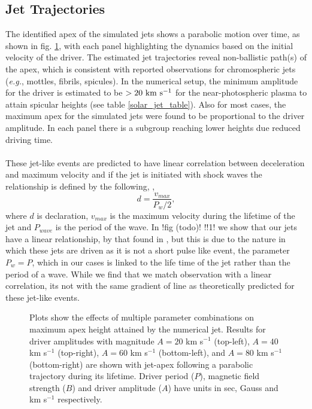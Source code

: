 \documentclass[12pt]{ociamthesis}
\newcommand{\np}{\\ \\}
\begin{document}
\subsection{Jet Trajectories}
\label{subsec:jet_traj}
The identified apex of the simulated jets shows a parabolic motion over time, as shown in fig. \ref{jet_traj}, with each panel highlighting the dynamics based on the initial velocity of the driver. The estimated jet trajectories reveal non-ballistic path(s) of the apex, which is consistent with reported observations \citep{Hansteen2006ApJ, Rouppe2007ApJ660L169R, Pontieu2007PASJ} for chromospheric jets (\textit{e.g.}, mottles, fibrils, spicules). In the numerical setup, the minimum amplitude for the driver is estimated to be $>20 ~\rm{km ~s^{-1}}$ for the near-photospheric plasma to attain spicular heights (see table \ref{solar_jet_table}). Also for most cases, the maximum apex for the simulated jets were found to be proportional to the driver amplitude. In each panel there is a subgroup reaching lower heights due reduced driving time. \np  
%
These jet-like events are predicted to have linear correlation between deceleration and maximum velocity and if the jet is initiated with shock waves the relationship is defined by the following, \citep{Heggland2007ApJ6661277H},
\begin{equation}
d = \frac{v_{max}}{P_{w}/2},
\end{equation}
where $d$ is declaration, $v_{max}$ is the maximum velocity during the lifetime of the jet and $P_{wave}$ is the period of the wave. In !fig (todo)! !!1! we show that our jets have a linear relationship, by that found in \citep{Heggland2007ApJ6661277H}, but this is due to the nature in which these jets are driven as it is not a short pulse like event, the parameter $P_{w}=P$, which in our cases is linked to the life time of the jet rather than the period of a wave. While we find that we match observation with a linear correlation, its not with the same gradient of line as theoretically predicted for these jet-like events.
\begin{figure}
\captionsetup[subfigure]{labelformat=empty}
\centering
{} 
\caption{Plots show the effects of multiple parameter combinations on maximum apex height attained by the numerical jet. Results for driver amplitudes with magnitude $A = 20$ km s$^{-1}$ (top-left), $A = 40$ km s$^{-1}$ (top-right), $A = 60$ km s$^{-1}$ (bottom-left), and $A = 80$ km s$^{-1}$ (bottom-right) are shown with jet-apex following a parabolic trajectory during its lifetime. Driver period ($P$), magnetic field strength ($B$) and driver amplitude ($A$) have units in sec, Gauss and km s$^{-1}$ respectively.}
\label{jet_traj}
\end{figure}
\end{document}
